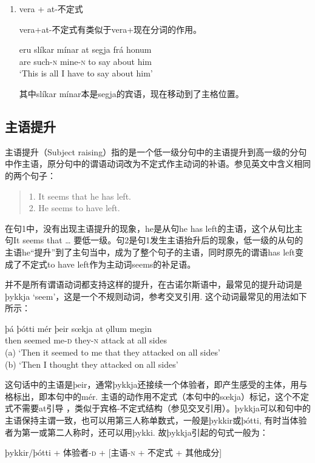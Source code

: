 \begin{enumerate}
\item vera + at-不定式

vera+at-不定式有类似于vera+现在分词的作用。
\begin{exe}
    \ex
    \gll eru	slíkar	mínar	at	segja	frá	honum\\
are	such-\textsc{n}	mine-\textsc{n}	to	say	about	him\\
\trans`This is all I have to say about him’
\end{exe}

其中slíkar mínar本是segja的宾语，现在移动到了主格位置。
\end{enumerate}

\subsection{主语提升}
主语提升（Subject raising）指的是一个低一级分句中的主语提升到高一级的分句中作主语，原分句中的谓语动词改为不定式作主动词的补语。参见英文中含义相同的两个句子：
\begin{quote}
  1. It seems that he has left.\\
2. He seems to have left.  
\end{quote}

在句1中，没有出现主语提升的现象，he是从句he has left的主语，这个从句比主句It seems that … 要低一级。句2是句1发生主语抬升后的现象，低一级的从句的主语he“提升”到了主句当中，成为了整个句子的主语，同时原先的谓语has left变成了不定式to have left作为主动词seems的补足语。

并不是所有谓语动词都支持这样的提升，在古诺尔斯语中，最常见的提升动词是þykkja `seem’，这是一个不规则动词，参考交叉引用. 这个动词最常见的用法如下所示：
\begin{exe}
    \ex
    \gll þá	þótti	mér	þeir	sœkja	at	ǫllum	megin\\
then	seemed	me-\textsc{d}	they-\textsc{n}	attack	at	all	sides\\
\trans (a) `Then it seemed to me that they attacked on all sides’\\
(b) `Then I thought they attacked on all sides’
\end{exe}

这句话中的主语是þeir，通常þykkja还接续一个体验者，即产生感受的主体，用与格标出，即本句中的mér. 主语的动作用不定式（本句中的sœkja）标记，这个不定式不需要at引导 ，类似于宾格-不定式结构（参见交叉引用）。þykkja可以和句中的主语保持主谓一致，也可以用第三人称单数式，一般是þykkir或þótti, 有时当体验者为第一或第二人称时，还可以用þykki. 故þykkja引起的句式一般为：
\begin{info}
þykkir/þótti + 体验者-\textsc{d} + [主语-\textsc{n} + 不定式 + 其他成分]
\end{info}

